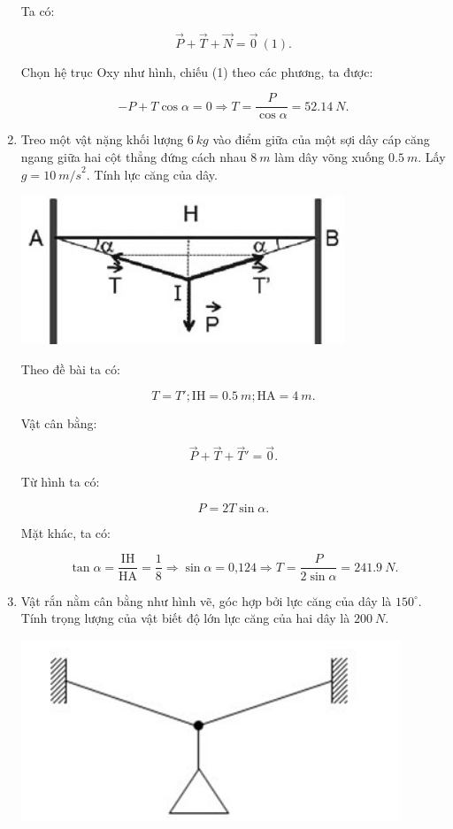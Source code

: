\begin{enumerate}[label=\bfseries Bài \arabic*:]
{		Ta có:
		
		$$\vec P + \vec T + \vec N = \vec 0\ (1).$$
		
		Chọn hệ trục Oxy như hình, chiếu (1) theo các phương, ta được:
		
		$$ - P + T\cos \alpha = 0 \Rightarrow T = \dfrac{P}{\cos \alpha} = \SI{52,14}{N}.$$
	}
	\item {}
	
	
	{
		Treo một vật nặng khối lượng $\SI{6}{kg}$ vào điểm giữa của một sợi dây cáp căng ngang giữa hai cột thẳng đứng cách nhau $\SI{8}{m}$ làm dây võng xuống $\SI{0,5}{m}$. Lấy $g=\SI{10}{m/s}^2$. Tính lực căng của dây.
	}
	
	\hideall
	{
		\begin{center}
			\includegraphics[scale=0.8]{../figs/VN10-2022-PH-TP019-10.jpg}
		\end{center}
		
		Theo đề bài ta có:
		
		$$T = T'; \text{IH} = \SI{0,5}{m}; \text{HA} = \SI{4}{m}.$$
		
		Vật cân bằng:
		
		$$\vec P + \vec T + \vec T' = \vec 0.$$
		
		Từ hình ta có:
		
		$$P = 2T \sin \alpha.$$
		
		Mặt khác, ta có:
		
		$$\tan \alpha = \dfrac{\text{IH}}{\text{HA}} = \dfrac{1}{8} \Rightarrow \sin \alpha = \text{0,124} \Rightarrow T = \dfrac{P}{2\sin \alpha} = \SI{241,9}{N}.$$
	}
	\item {}
	
	
	{
		Vật rắn nằm cân bằng như hình vẽ, góc hợp bởi lực căng của dây là $150^\circ$. Tính trọng lượng của vật biết độ lớn lực căng của hai dây là $\SI{200}{N}$.
		\begin{center}
			\includegraphics[scale=0.8]{../figs/VN10-2022-PH-TP019-8.jpg}
		\end{center}
	}
	

\end{enumerate}
